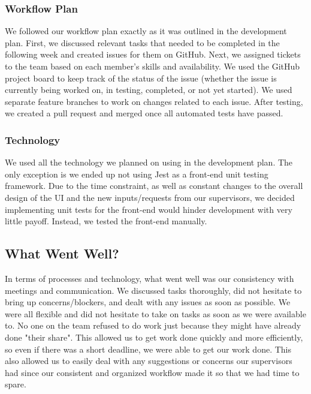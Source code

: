 \documentclass{article}
\begin{document}
\subsubsection{Workflow Plan}
We followed our workflow plan exactly as it was outlined in the development plan. First, we discussed 
relevant tasks that needed to be completed in the following week and created issues for them on GitHub. 
Next, we assigned tickets to the team based on each member's skills and availability. We used the 
GitHub project board to keep track of the status of the issue (whether the issue is currently being 
worked on, in testing, completed, or not yet started). We used separate feature branches to work on 
changes related to each issue. After testing, we created a pull request and merged once all automated 
tests have passed.

\subsubsection{Technology}
We used all the technology we planned on using in the development plan. The only exception is we ended 
up not using Jest as a front-end unit testing framework. Due to the time constraint, as well as constant 
changes to the overall design of the UI and the new inputs/requests from our supervisors, we decided 
implementing unit tests for the front-end would hinder development with very little payoff. Instead, 
we tested the front-end manually.

\subsection{What Went Well?}


In terms of processes and technology, what went well was our consistency with meetings and communication. 
We discussed tasks thoroughly, did not hesitate to bring up concerns/blockers, and dealt with any issues 
as soon as possible. We were all flexible and did not hesitate to take on tasks as soon as we were 
available to. No one on the team refused to do work just because they might have already done "their 
share". This allowed us to get work done quickly and more efficiently, so even if there was a short 
deadline, we were able to get our work done. This also allowed us to easily deal with any suggestions 
or concerns our supervisors had since our consistent and organized workflow made it so that we had 
time to spare.\\
\end{document}
